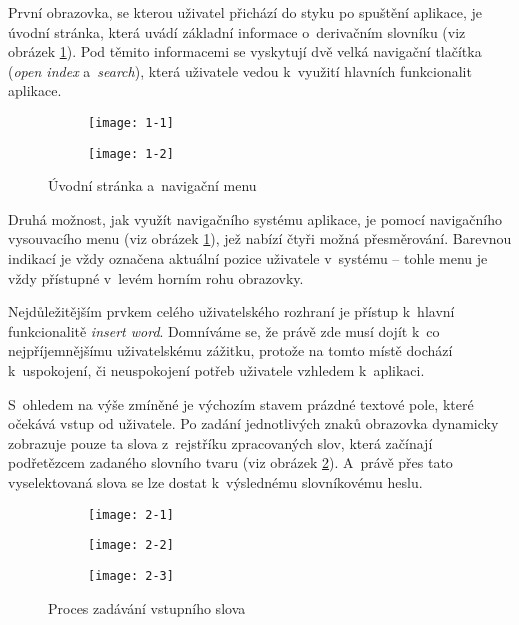 První obrazovka, se kterou uživatel přichází do styku po spuštění
aplikace, je úvodní stránka, která uvádí základní informace o~derivačním
slovníku (viz obrázek \ref{1}). Pod těmito informacemi se vyskytují dvě
velká navigační tlačítka (\emph{open index} a~\emph{search}), která
uživatele vedou k~využití hlavních funkcionalit aplikace.

\begin{figure}[ht]
  \begin{subfigure}[b]{0.45\textwidth}
    \texttt{[image: 1-1]}
  \end{subfigure}
  \hfill
  \begin{subfigure}[b]{0.45\textwidth}
    \texttt{[image: 1-2]}
  \end{subfigure}
  \caption{Úvodní stránka a~navigační menu}
  \label{1}
\end{figure}

Druhá možnost, jak využít navigačního systému aplikace, je pomocí
navigačního vysouvacího menu (viz obrázek \ref{1}), jež nabízí čtyři
možná přesměrování. Barevnou indikací je vždy označena aktuální pozice
uživatele v~systému -- tohle menu je vždy přístupné v~levém horním rohu
obrazovky.

Nejdůležitějším prvkem celého uživatelského rozhraní je přístup k~hlavní
funkcionalitě \emph{insert word}. Domníváme se, že právě zde musí dojít
k~co nejpříjemnějšímu uživatelskému zážitku, protože na tomto místě
dochází k~uspokojení, či neuspokojení potřeb uživatele vzhledem
k~aplikaci.

S~ohledem na výše zmíněné je výchozím stavem prázdné textové pole, které
očekává vstup od uživatele. Po zadání jednotlivých znaků obrazovka
dynamicky zobrazuje pouze ta slova z~rejstříku zpracovaných slov, která
začínají podřetězcem zadaného slovního tvaru (viz obrázek \ref{2}).
A~právě přes tato vyselektovaná slova se lze dostat k~výslednému
slovníkovému heslu.

\begin{figure}[ht]
  \begin{subfigure}[b]{0.3\textwidth}
    \texttt{[image: 2-1]}
  \end{subfigure}
  \hfill
  \begin{subfigure}[b]{0.3\textwidth}
    \texttt{[image: 2-2]}
  \end{subfigure}
   \hfill
  \begin{subfigure}[b]{0.3\textwidth}
   \texttt{[image: 2-3]}
  \end{subfigure}
  \caption{Proces zadávání vstupního slova}
  \label{2}
\end{figure}

